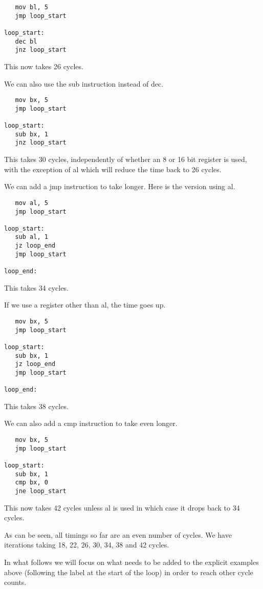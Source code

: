 \documentclass[a4paper,10pt]{amsart}
\begin{document}
\begin{lstlisting}
   mov bl, 5
   jmp loop_start

loop_start:
   dec bl
   jnz loop_start
\end{lstlisting}

This now takes 26 cycles.

We can also use the sub instruction instead of dec.

\begin{lstlisting}
   mov bx, 5
   jmp loop_start

loop_start:
   sub bx, 1
   jnz loop_start
\end{lstlisting}

This takes 30 cycles, independently of whether an 8 or 16 bit register is used,
with the exception of al which will reduce the time back to 26 cycles.

We can add a jmp instruction to take longer. Here is the version using al.

\begin{lstlisting}
   mov al, 5
   jmp loop_start

loop_start:
   sub al, 1
   jz loop_end
   jmp loop_start

loop_end:
\end{lstlisting}

This takes 34 cycles.

If we use a register other than al, the time goes up.

\begin{lstlisting}
   mov bx, 5
   jmp loop_start

loop_start:
   sub bx, 1
   jz loop_end
   jmp loop_start

loop_end:
\end{lstlisting}

This takes 38 cycles.

We can also add a cmp instruction to take even longer.

\begin{lstlisting}
   mov bx, 5
   jmp loop_start

loop_start:
   sub bx, 1
   cmp bx, 0
   jne loop_start
\end{lstlisting}

This now takes 42 cycles unless al is used in which case it drops back to 34
cycles.

As can be seen, all timings so far are an even number of cycles. We have
iterations taking 18, 22, 26, 30, 34, 38 and 42 cycles.

In what follows we will focus on what needs to be added to the explicit
examples above (following the label at the start of the loop) in order to reach
other cycle counts.
\end{document}

